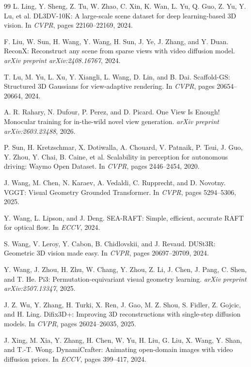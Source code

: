 \documentclass[10pt,twocolumn,letterpaper]{article}
\begin{document}
\begin{thebibliography}{99}
L. Ling, Y. Sheng, Z. Tu, W. Zhao, C. Xin, K. Wan, L. Yu, Q. Guo, Z. Yu, Y. Lu, et al.
DL3DV-10K: A large-scale scene dataset for deep learning-based 3D vision.
In \emph{CVPR}, pages 22160--22169, 2024.

F. Liu, W. Sun, H. Wang, Y. Wang, H. Sun, J. Ye, J. Zhang, and Y. Duan.
ReconX: Reconstruct any scene from sparse views with video diffusion model.
\emph{arXiv preprint arXiv:2408.16767}, 2024.

T. Lu, M. Yu, L. Xu, Y. Xiangli, L. Wang, D. Lin, and B. Dai.
Scaffold-GS: Structured 3D Gaussians for view-adaptive rendering.
In \emph{CVPR}, pages 20654--20664, 2024.

A. R. Rahary, N. Dufour, P. Perez, and D. Picard.
One View Is Enough! Monocular training for in-the-wild novel view generation.
\emph{arXiv preprint arXiv:2603.23488}, 2026.

P. Sun, H. Kretzschmar, X. Dotiwalla, A. Chouard, V. Patnaik, P. Tsui, J. Guo, Y. Zhou, Y. Chai, B. Caine, et al.
Scalability in perception for autonomous driving: Waymo Open Dataset.
In \emph{CVPR}, pages 2446--2454, 2020.

J. Wang, M. Chen, N. Karaev, A. Vedaldi, C. Rupprecht, and D. Novotny.
VGGT: Visual Geometry Grounded Transformer.
In \emph{CVPR}, pages 5294--5306, 2025.

Y. Wang, L. Lipson, and J. Deng.
SEA-RAFT: Simple, efficient, accurate RAFT for optical flow.
In \emph{ECCV}, 2024.

S. Wang, V. Leroy, Y. Cabon, B. Chidlovskii, and J. Revaud.
DUSt3R: Geometric 3D vision made easy.
In \emph{CVPR}, pages 20697--20709, 2024.

Y. Wang, J. Zhou, H. Zhu, W. Chang, Y. Zhou, Z. Li, J. Chen, J. Pang, C. Shen, and T. He.
Pi3: Permutation-equivariant visual geometry learning.
\emph{arXiv preprint arXiv:2507.13347}, 2025.

J. Z. Wu, Y. Zhang, H. Turki, X. Ren, J. Gao, M. Z. Shou, S. Fidler, Z. Gojcic, and H. Ling.
Difix3D+: Improving 3D reconstructions with single-step diffusion models.
In \emph{CVPR}, pages 26024--26035, 2025.

J. Xing, M. Xia, Y. Zhang, H. Chen, W. Yu, H. Liu, G. Liu, X. Wang, Y. Shan, and T.-T. Wong.
DynamiCrafter: Animating open-domain images with video diffusion priors.
In \emph{ECCV}, pages 399--417, 2024.


\end{thebibliography}
\end{document}
